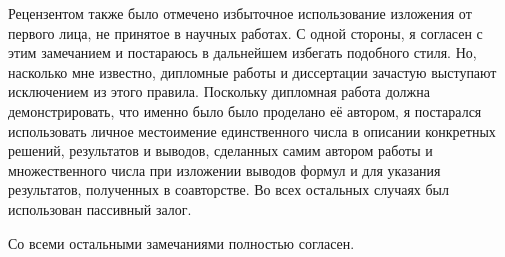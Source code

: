 \documentclass[draft]{trnotes}
\begin{document}
Рецензентом также было отмечено избыточное использование изложения от первого лица, не принятое в научных работах.
С одной стороны, я согласен с этим замечанием и постараюсь в дальнейшем избегать подобного стиля. 
Но, насколько мне известно, дипломные работы и диссертации зачастую выступают исключением из этого правила.
Поскольку дипломная работа должна демонстрировать, что именно было было проделано её автором, 
я постарался использовать личное местоимение единственного числа в описании конкретных решений, 
результатов и выводов, сделанных самим автором работы и множественного числа при
изложении выводов формул и для указания результатов, полученных в соавторстве. 
Во всех остальных случаях был использован пассивный залог.

Со всеми остальными замечаниями полностью согласен.
\end{document}
